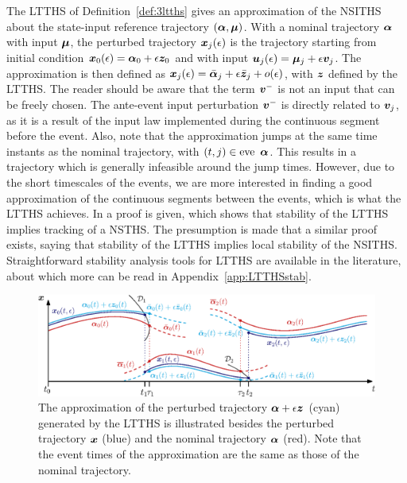 \documentclass[../DC2017114Bouma.tex]{subfiles}
\begin{document}
The LTTHS of Definition~\ref{def:3ltths} gives an approximation of the NSITHS about the state-input reference trajectory $(\boldsymbol{\alpha},\boldsymbol{\mu})$. With a nominal trajectory $\boldsymbol{\alpha}$ with input $\boldsymbol{\mu}$, the perturbed trajectory ${\boldsymbol{x}}_j(\epsilon)$ is the trajectory starting from initial condition ${\boldsymbol{x}}_0(\epsilon) = \boldsymbol{\alpha}_0 + \epsilon{\boldsymbol{z}}_0$ and with input ${\boldsymbol{u}}_j(\epsilon) = \boldsymbol{\mu}_j + \epsilon{\boldsymbol{v}}_j$. The approximation is then defined as ${\boldsymbol{x}}_j(\epsilon) = \bar{\boldsymbol{\alpha}}_j + \epsilon\bar{{\boldsymbol{z}}}_j + o(\epsilon)$, with ${\boldsymbol{z}}$ defined by the LTTHS. The reader should be aware that the term ${\boldsymbol{v}}^-$ is not an input that can be freely chosen. The ante-event input perturbation ${\boldsymbol{v}}^-$ is directly related to ${\boldsymbol{v}}_j$, as it is a result of the input law implemented during the continuous segment before the event. Also, note that the approximation jumps at the same time instants as the nominal trajectory, with $(t,j) \in \eve\ \alphab$. This results in a trajectory which is generally infeasible around the jump times. However, due to the short timescales of the events, we are more interested in finding a good approximation of the continuous segments between the events, which is what the LTTHS achieves. In \cite{Rijnen2017} a proof is given, which shows that stability of the LTTHS implies tracking of a NSTHS. The presumption is made that a similar proof exists, saying that stability of the LTTHS implies local stability of the NSITHS. Straightforward stability analysis tools for LTTHS are available in the literature, about which more can be read in Appendix~\ref{app:LTTHSstab}.
%
\begin{figure}[bt!]
\centering
\includegraphics[width=\textwidth]{refspreadapprox.eps}\caption{The approximation of the perturbed trajectory $\boldsymbol{\alpha} + \epsilon{\boldsymbol{z}}$ (cyan) generated by the LTTHS is illustrated besides the perturbed trajectory ${\boldsymbol{x}}$ (blue) and the nominal trajectory $\boldsymbol{\alpha}$ (red). Note that the event times of the approximation are the same as those of the nominal trajectory.} \label{fig:3refspreadapprox}
\end{figure}
\end{document}
